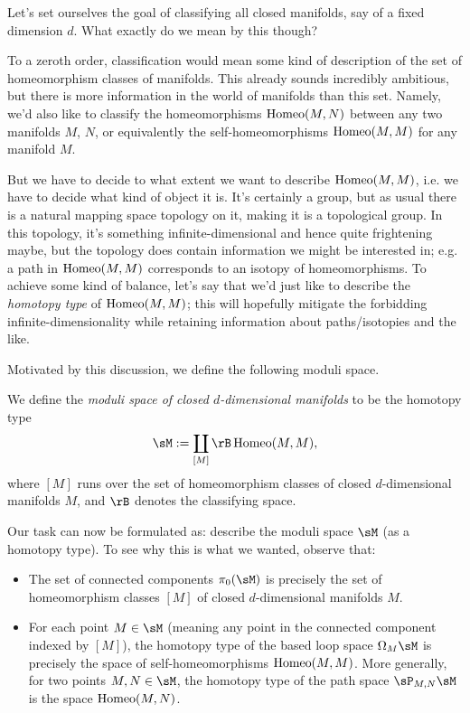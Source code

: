 \begin{nothing}
  \label{manifolds-goal}
  Let's set ourselves the goal of classifying all closed manifolds, say of a fixed dimension $d$. What exactly do we mean by this though?

  To a zeroth order, classification would mean some kind of description of the set of homeomorphism classes of manifolds. This already sounds incredibly ambitious, but there is more information in the world of manifolds than this set. Namely, we'd also like to classify the homeomorphisms $\operatorname{Homeo}(M,N)$ between any two manifolds $M$, $N$, or equivalently the self-homeomorphisms $\operatorname{Homeo}(M,M)$ for any manifold $M$.

  But we have to decide to what extent we want to describe $\operatorname{Homeo}(M,M)$, i.e. we have to decide what kind of object it is. It's certainly a group, but as usual there is a natural mapping space topology on it, making it is a topological group. In this topology, it's something infinite-dimensional and hence quite frightening maybe, but the topology does contain information we might be interested in; e.g. a path in $\operatorname{Homeo}(M,M)$ corresponds to an isotopy of homeomorphisms. To achieve some kind of balance, let's say that we'd just like to describe the \emph{homotopy type} of $\operatorname{Homeo}(M,M)$; this will hopefully mitigate the forbidding infinite-dimensionality while retaining information about paths/isotopies and the like.

  Motivated by this discussion, we define the following moduli space.

  \begin{subdefinition}
    \label{manifolds-goal-moduli}
    We define the \emph{moduli space of closed $d$-dimensional manifolds} to be the homotopy type
    \[
      \sM \ce \coprod_{[M]} \rB\Homeo(M,M),
    \]
    where $[M]$ runs over the set of homeomorphism classes of closed $d$-dimensional manifolds $M$, and $\rB$ denotes the classifying space.
  \end{subdefinition}

  Our task can now be formulated as: describe the moduli space $\sM$ (as a homotopy type). To see why this is what we wanted, observe that:
  \begin{itemize}
  \item The set of connected components $\pi_0(\sM)$ is precisely the set of homeomorphism classes $[M]$ of closed $d$-dimensional manifolds $M$.
  \item For each point $M \in \sM$ (meaning any point in the connected component indexed by $[M]$), the homotopy type of the based loop space $\Omega_M\sM$ is precisely the space of self-homeomorphisms $\operatorname{Homeo}(M,M)$. More generally, for two points $M,N \in \sM$, the homotopy type of the path space $\sP_{M,N}\sM$ is the space $\operatorname{Homeo}(M,N)$.
  \end{itemize}


\end{nothing}
